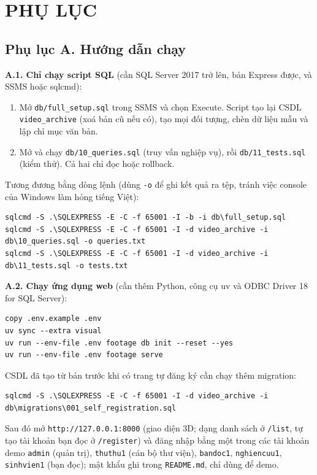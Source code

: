 \chapter*{PHỤ LỤC}

\section*{Phụ lục A. Hướng dẫn chạy}

\textbf{A.1. Chỉ chạy script SQL} (cần SQL Server 2017 trở lên, bản Express được, và SSMS
hoặc sqlcmd):
\begin{enumerate}
    \item Mở \texttt{db/full\_setup.sql} trong SSMS và chọn Execute. Script tạo lại CSDL
    \texttt{video\_archive} (xoá bản cũ nếu có), tạo mọi đối tượng, chèn dữ liệu mẫu và lập
    chỉ mục văn bản.
    \item Mở và chạy \texttt{db/10\_queries.sql} (truy vấn nghiệp vụ), rồi
    \texttt{db/11\_tests.sql} (kiểm thử). Cả hai chỉ đọc hoặc rollback.
\end{enumerate}
Tương đương bằng dòng lệnh (dùng \texttt{-o} để ghi kết quả ra tệp, tránh việc console của
Windows làm hỏng tiếng Việt):
\begin{lstlisting}[style=terminal, language={}]
sqlcmd -S .\SQLEXPRESS -E -C -f 65001 -I -b -i db\full_setup.sql
sqlcmd -S .\SQLEXPRESS -E -C -f 65001 -I -d video_archive -i db\10_queries.sql -o queries.txt
sqlcmd -S .\SQLEXPRESS -E -C -f 65001 -I -d video_archive -i db\11_tests.sql -o tests.txt
\end{lstlisting}

\textbf{A.2. Chạy ứng dụng web} (cần thêm Python, công cụ uv và ODBC Driver 18 for SQL Server):
\begin{lstlisting}[style=terminal, language={}]
copy .env.example .env
uv sync --extra visual
uv run --env-file .env footage db init --reset --yes
uv run --env-file .env footage serve
\end{lstlisting}
CSDL đã tạo từ bản trước khi có trang tự đăng ký cần chạy thêm migration:
\begin{lstlisting}[style=terminal, language={}]
sqlcmd -S .\SQLEXPRESS -E -C -f 65001 -I -d video_archive -i db\migrations\001_self_registration.sql
\end{lstlisting}
Sau đó mở \texttt{http://127.0.0.1:8000} (giao diện 3D; dạng danh sách ở \texttt{/list}, tự tạo
tài khoản bạn đọc ở \texttt{/register}) và đăng nhập bằng một trong các tài khoản demo
\texttt{admin} (quản trị), \texttt{thuthu1} (cán bộ thư viện), \texttt{bandoc1},
\texttt{nghiencuu1}, \texttt{sinhvien1} (bạn đọc); mật khẩu ghi trong \texttt{README.md}, chỉ
dùng để demo.

